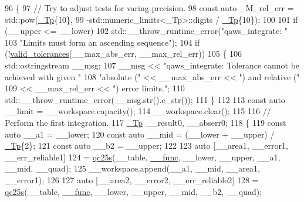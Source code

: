 \begin{DoxyCode}
96     \{
97       \textcolor{comment}{// Try to adjust tests for varing precision.}
98       \textcolor{keyword}{const} \textcolor{keyword}{auto} \_M\_rel\_err = std::pow(\hyperlink{namespace____gnu__cxx_a3b19a9c800ca194374ef9172290f7d79}{\_Tp}\{10\},
99                                  -std::numeric\_limits<\_Tp>::digits / \hyperlink{namespace____gnu__cxx_a3b19a9c800ca194374ef9172290f7d79}{\_Tp}\{10\});
100 
101       \textcolor{keywordflow}{if} (\_\_upper <= \_\_lower)
102         std::\_\_throw\_runtime\_error(\textcolor{stringliteral}{"qaws\_integrate: "}
103                                    \textcolor{stringliteral}{"Limits must form an ascending sequence"});
104       \textcolor{keywordflow}{if} (!\hyperlink{namespace____gnu__cxx_a86b1d89b2e2cb97614fdf3425d3dccd5}{valid\_tolerances}(\_\_max\_abs\_err, \_\_max\_rel\_err))
105         \{
106           std::ostringstream \_\_msg;
107           \_\_msg << \textcolor{stringliteral}{"qaws\_integrate: Tolerance cannot be achieved with given "}
108                    \textcolor{stringliteral}{"absolute ("} << \_\_max\_abs\_err << \textcolor{stringliteral}{") and relative ("}
109                 << \_\_max\_rel\_err << \textcolor{stringliteral}{") error limits."};
110           std::\_\_throw\_runtime\_error(\_\_msg.str().c\_str());
111         \}
112 
113       \textcolor{keyword}{const} \textcolor{keyword}{auto} \_\_limit = \_\_workspace.capacity();
114       \_\_workspace.clear();
115 
116       \textcolor{comment}{// Perform the first integration.}
117       \hyperlink{namespace____gnu__cxx_a3b19a9c800ca194374ef9172290f7d79}{\_Tp} \_\_result0, \_\_abserr0;
118       \{
119         \textcolor{keyword}{const} \textcolor{keyword}{auto} \_\_a1 = \_\_lower;
120         \textcolor{keyword}{const} \textcolor{keyword}{auto} \_\_mid = (\_\_lower + \_\_upper) / \hyperlink{namespace____gnu__cxx_a3b19a9c800ca194374ef9172290f7d79}{\_Tp}\{2\};
121         \textcolor{keyword}{const} \textcolor{keyword}{auto} \_\_b2 = \_\_upper;
122 
123         \textcolor{keyword}{auto} [\_\_area1, \_\_error1, \_\_err\_reliable1]
124           = \hyperlink{namespace____gnu__cxx_a5659189e193b420e201b6769d65289b9}{qc25s}(\_\_table, \hyperlink{namespace____gnu__cxx_af2b2f0c7a2ae72b922b1afefae5a65b2}{\_\_func}, \_\_lower, \_\_upper, \_\_a1, \_\_mid, \_\_quad);
125         \_\_workspace.append(\_\_a1, \_\_mid, \_\_area1, \_\_error1);
126 
127         \textcolor{keyword}{auto} [\_\_area2, \_\_error2, \_\_err\_reliable2]
128           = \hyperlink{namespace____gnu__cxx_a5659189e193b420e201b6769d65289b9}{qc25s}(\_\_table, \hyperlink{namespace____gnu__cxx_af2b2f0c7a2ae72b922b1afefae5a65b2}{\_\_func}, \_\_lower, \_\_upper, \_\_mid, \_\_b2, \_\_quad);

\end{DoxyCode}
